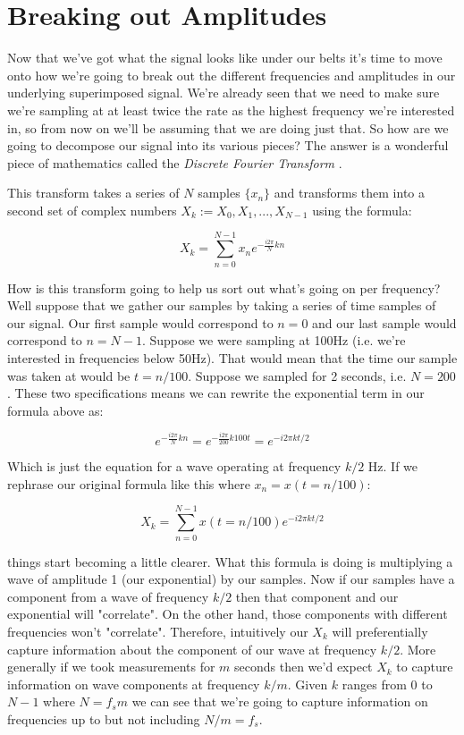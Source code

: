 \documentclass[10pt,a5paper]{book}
\begin{document}
\clearpage
\section{Breaking out Amplitudes}
Now that we've got what the signal looks like under our belts it's time to move onto how we're going to break out the different frequencies and amplitudes in our underlying superimposed signal. We're already seen that we need to make sure we're sampling at at least twice the rate as the highest frequency we're interested in, so from now on we'll be assuming that we are doing just that. So how are we going to decompose our signal into its various pieces? The answer is a wonderful piece of mathematics called the \textit{Discrete Fourier Transform} \cite{dft}.

This transform takes a series of $N$ samples $\{x_n\}$ and transforms them into a second set of complex numbers ${X_k}:=X_0, X_1, ..., X_{N-1}$ using the formula:

\begin{equation}
X_k = \sum_{n=0}^{N-1}x_n e^{-\frac{i2\pi}{N}kn}
\end{equation}

How is this transform going to help us sort out what's going on per frequency? Well suppose that we gather our samples by taking a series of time samples of our signal. Our first sample would correspond to $n=0$ and our last sample would correspond to $n=N-1$. Suppose we were sampling at 100Hz (i.e. we're interested in frequencies below 50Hz). That would mean that the time our sample was taken at would be $t=n/100$. Suppose we sampled for 2 seconds, i.e. $N=200$. These two specifications means we can rewrite the exponential term in our formula above as:

\begin{equation}
e^{-\frac{i2\pi}{N}kn}=e^{-\frac{i2\pi}{200}k100t}=e^{-i2\pi kt/2}
\end{equation}

Which is just the equation for a wave operating at frequency $k/2$ Hz. If we rephrase our original formula like this where $x_n=x(t=n/100)$:

\begin{equation}
X_k = \sum_{n=0}^{N-1}x(t=n/100)e^{-i2\pi kt/2}
\end{equation}

things start becoming a little clearer. What this formula is doing is multiplying a wave of amplitude 1 (our exponential) by our samples. Now if our samples have a component from a wave of frequency $k/2$ then that component and our exponential will "correlate". On the other hand, those components with different frequencies won't "correlate". Therefore, intuitively our $X_k$ will preferentially capture information about the component of our wave at frequency $k/2$. More generally if we took measurements for $m$ seconds then we'd expect $X_k$ to capture information on wave components at frequency $k/m$. Given $k$ ranges from $0$ to $N-1$ where $N=f_s m$ we can see that we're going to capture information on frequencies up to but not including $N/m=f_s$.
\end{document}
